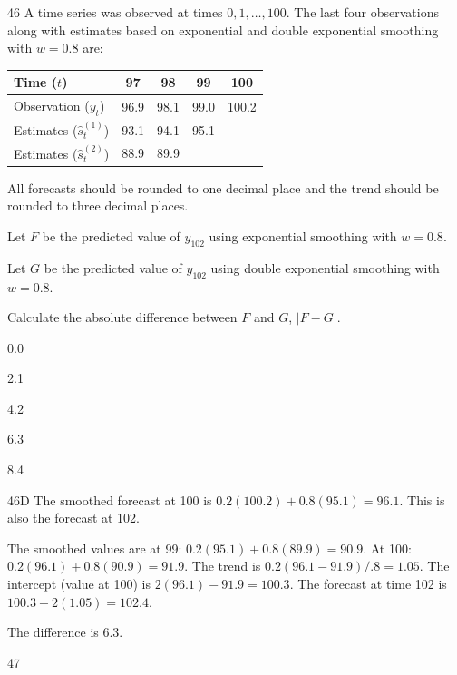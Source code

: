 \begin{question}{46}
A time series was observed at times $0, 1, \ldots, 100$. The last four observations along with estimates based on exponential and double exponential smoothing with $w = 0.8$ are:

\begin{center}
\begin{tabular}{|l|c|c|c|c|}
\hline
Time ($t$) & 97 & 98 & 99 & 100 \\ \hline
Observation ($y_t$) & 96.9 & 98.1 & 99.0 & 100.2 \\ \hline
Estimates ($\hat{s}_t^{(1)}$) & 93.1 & 94.1 & 95.1 & \\ \hline
Estimates ($\hat{s}_t^{(2)}$) & 88.9 & 89.9 & & \\ \hline
\end{tabular}
\end{center}

All forecasts should be rounded to one decimal place and the trend should be rounded to three decimal places.

Let $F$ be the predicted value of $y_{102}$ using exponential smoothing with $w = 0.8$.

Let $G$ be the predicted value of $y_{102}$ using double exponential smoothing with $w = 0.8$.

Calculate the absolute difference between $F$ and $G$, $|F - G|$.

\begin{choices}
\item 0.0
\item 2.1
\item 4.2
\item 6.3
\item 8.4
\end{choices}
\end{question}
\begin{solution}{46}{D}
The smoothed forecast at 100 is $0.2(100.2) + 0.8(95.1) = 96.1$. This is also the forecast at 102.

The smoothed values are at 99: $0.2(95.1) + 0.8(89.9) = 90.9$. At 100: $0.2(96.1) + 0.8(90.9) = 91.9$. The trend is $0.2(96.1 - 91.9)/.8 = 1.05$. The intercept (value at 100) is $2(96.1) - 91.9 = 100.3$. The forecast at time 102 is $100.3 + 2(1.05) = 102.4$.

The difference is 6.3.
\end{solution}

\begin{question}{47}
\deleted
\end{question}

